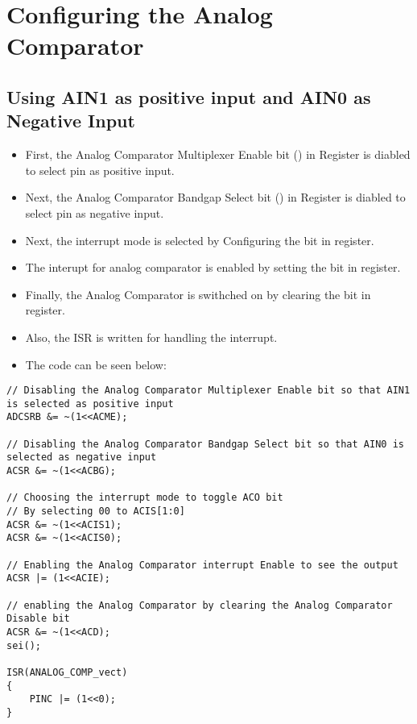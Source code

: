 \documentclass{article}
\begin{document}
\section{Configuring the Analog Comparator}
\subsection{Using AIN1 as positive input and AIN0 as Negative Input}
\begin{itemize}
    \item First, the Analog Comparator Multiplexer Enable bit () in  Register is diabled to select  pin as positive input.
    \item Next, the Analog Comparator Bandgap Select bit () in  Register is diabled to select  pin as negative input.
    \item Next, the interrupt mode is selected by Configuring the  bit in  register.
    \item The interupt for analog comparator is enabled by setting the  bit in  register.
    \item Finally, the Analog Comparator is swithched on by clearing the  bit in  register.
    \item Also, the ISR is written for handling the interrupt.
    \item The code can be seen below:
\end{itemize}

\begin{verbatim}
// Disabling the Analog Comparator Multiplexer Enable bit so that AIN1 is selected as positive input
ADCSRB &= ~(1<<ACME);

// Disabling the Analog Comparator Bandgap Select bit so that AIN0 is selected as negative input
ACSR &= ~(1<<ACBG);

// Choosing the interrupt mode to toggle ACO bit 
// By selecting 00 to ACIS[1:0]
ACSR &= ~(1<<ACIS1);
ACSR &= ~(1<<ACIS0);

// Enabling the Analog Comparator interrupt Enable to see the output
ACSR |= (1<<ACIE);

// enabling the Analog Comparator by clearing the Analog Comparator Disable bit
ACSR &= ~(1<<ACD);
sei();

ISR(ANALOG_COMP_vect)
{
    PINC |= (1<<0);
}
\end{verbatim}
\end{document}
